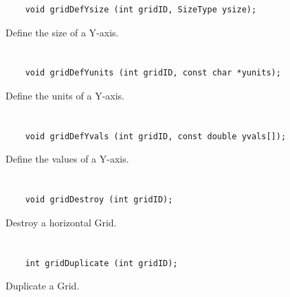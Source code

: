 \begin{verbatim}
    void gridDefYsize (int gridID, SizeType ysize);
\end{verbatim}

Define the size of a Y-axis.


\section*{\tt {}}

\begin{verbatim}
    void gridDefYunits (int gridID, const char *yunits);
\end{verbatim}

Define the units of a Y-axis.


\section*{\tt {}}

\begin{verbatim}
    void gridDefYvals (int gridID, const double yvals[]);
\end{verbatim}

Define the values of a Y-axis.


\section*{\tt {}}

\begin{verbatim}
    void gridDestroy (int gridID);
\end{verbatim}

Destroy a horizontal Grid.


\section*{\tt {}}

\begin{verbatim}
    int gridDuplicate (int gridID);
\end{verbatim}

Duplicate a Grid.


\section*{\tt {}}

